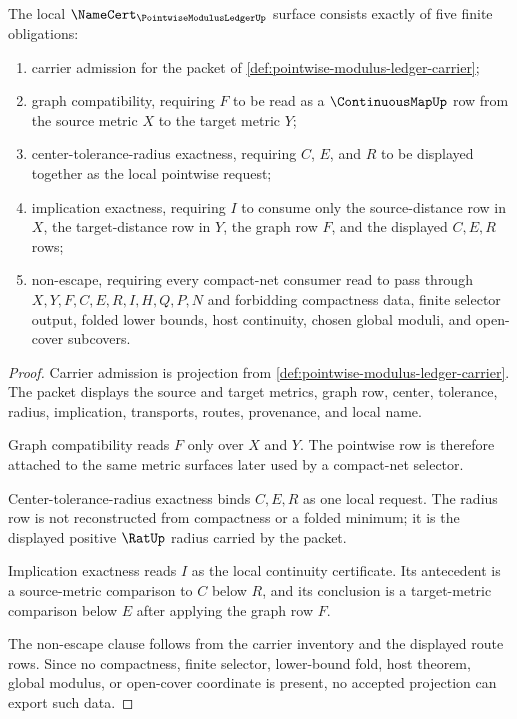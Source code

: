 \begin{theorem}
\label{thm:pointwise-modulus-ledger-namecert-obligations}
The local $\NameCert_{\PointwiseModulusLedgerUp}$ surface consists exactly of five finite obligations:
\begin{enumerate}
\item carrier admission for the packet of \autoref{def:pointwise-modulus-ledger-carrier};
\item graph compatibility, requiring $F$ to be read as a $\ContinuousMapUp$ row from the source metric $X$ to the target metric $Y$;
\item center-tolerance-radius exactness, requiring $C$, $E$, and $R$ to be displayed together as the local pointwise request;
\item implication exactness, requiring $I$ to consume only the source-distance row in $X$, the target-distance row in $Y$, the graph row $F$, and the displayed $C,E,R$ rows;
\item non-escape, requiring every compact-net consumer read to pass through $X,Y,F,C,E,R,I,H,Q,P,N$ and forbidding compactness data, finite selector output, folded lower bounds, host continuity, chosen global moduli, and open-cover subcovers.
\end{enumerate}
\end{theorem}

\begin{proof}
Carrier admission is projection from \autoref{def:pointwise-modulus-ledger-carrier}. The packet displays the source and target metrics, graph row, center, tolerance, radius, implication, transports, routes, provenance, and local name.

Graph compatibility reads $F$ only over $X$ and $Y$. The pointwise row is therefore attached to the same metric surfaces later used by a compact-net selector.

Center-tolerance-radius exactness binds $C,E,R$ as one local request. The radius row is not reconstructed from compactness or a folded minimum; it is the displayed positive $\RatUp$ radius carried by the packet.

Implication exactness reads $I$ as the local continuity certificate. Its antecedent is a source-metric comparison to $C$ below $R$, and its conclusion is a target-metric comparison below $E$ after applying the graph row $F$.

The non-escape clause follows from the carrier inventory and the displayed route rows. Since no compactness, finite selector, lower-bound fold, host theorem, global modulus, or open-cover coordinate is present, no accepted projection can export such data.
\end{proof}

